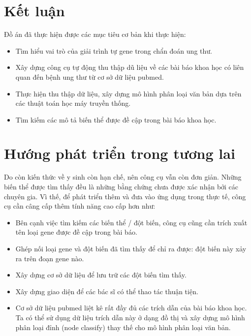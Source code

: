 \documentclass[../DoAn.tex]{subfiles}
\begin{document}
\section{Kết luận}

Đồ án đã thực hiện được các mục tiêu cơ bản khi thực hiện:
\begin{itemize}
 \item Tìm hiểu vai trò của giải trình tự gene trong chẩn đoán ung thư.
 \item Xây dựng công cụ tự động thu thập dũ liệu về các bài báo khoa học có liên quan đến bệnh ung thư từ cơ sở dữ liệu pubmed.
 \item Thực hiện thu thập dữ liệu, xây dựng mô hình phân loại văn bản dựa trên các thuật toán học máy truyền thống.
 \item Tìm kiếm các mô tả biến thể được đề cập trong bài báo khoa học.
\end{itemize}

\section{Hướng phát triển trong tương lai}

Do còn kiến thức về y sinh còn hạn chế, nên công cụ vẫn còn đơn giản. Những biến thể được tìm thấy đều là những bằng chứng chưa được xác nhận bởi các chuyên gia. Vì thế, để phát triển thêm và đưa vào ứng dụng trong thực tế, công cụ cần câng cấp thêm tính năng cao cấp hơn như:
\begin{itemize}
 \item Bên cạnh việc tìm kiếm các biến thể / đột biến, công cụ cũng cần trích xuất tên loại gene được đề cập trong bài báo.
 \item Ghép nối loại gene và đột biến đã tìm thấy để chỉ ra được: đột biến này xảy ra trên đoạn gene nào.
 \item Xây dựng cơ sở dữ liệu để lưu trữ các đột biến tìm thấy.
 \item Xây dựng giao diện để các bác sĩ có thể thao tác thuận tiện.
 \item Cơ sở dữ liệu pubmed liệt kê rất đầy đủ các trích dẫn của bài báo khoa học. Ta có thể sử dụng dữ liệu trích dẫn này ở dạng đồ thị và xây dựng mô hình phân loại đỉnh (node classify) thay thế cho mô hình phân loại văn bản.
\end{itemize}
\end{document}
